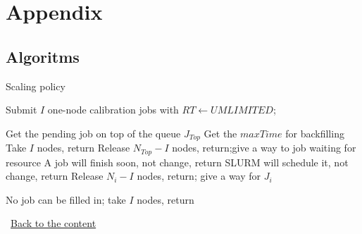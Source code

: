 
\chapter{Appendix} %



\ifpdf
    \graphicspath{{X/figures/PNG/}{X/figures/PDF/}{X/figures/}}
\else
    \graphicspath{{X/figures/EPS/}{X/figures/}}
\fi

% 
\section{Algoritms}
\makeatletter
\def\BState{\State\hskip-\ALG@thistlm}
\makeatother
\begin{algorithm}[htb]
    \caption{Scaling policy}\label{algo:scalingPolicy}
    \begin{algorithmic}[1]
        \State Submit $I$ one-node calibration jobs with $RT\gets UMLIMITED$;
        
      \Else 
         \State Get the pending job on top of the queue $J_{Top}$
         \State Get the $maxTime$ for backfilling
            \State Take $I$ nodes, return
         \EndIf
            \State Release $N_{Top}-I$ nodes, return;give a way to job waiting for resource
         \EndIf
            \State A job will finish soon, not change, return 
          \EndIf
         \EndFor
                    \State SLURM will schedule it, not change, return 
                \EndIf
                    \State Release $N_{i}-I$ nodes, return; give a way for $J_{i}$
                \EndIf
            \EndIf
         \EndFor

      \EndIf
      \State No job can be filled in; take $I$ nodes, return
      \EndProcedure
    \end{algorithmic}\
    \hyperlink{Algo1}{Back to the content}
  \end{algorithm}


